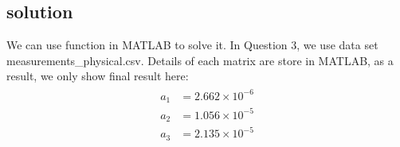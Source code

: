 \documentclass[titlepage,a4paper]{article}
\begin{document}
    \subsection{solution}    
        We can use function in MATLAB to solve it. In Question 3, we use data set measurements_physical.csv. Details of each matrix are store in MATLAB, as a result, we only show final result here:
        \begin{align}
        \begin{split}
           a_1 &= 2.662\times10^{-6}\\
           a_2 &= 1.056\times10^{-5}\\
           a_3 &= 2.135\times10^{-5}      
        \end{split}
        \end{align}     


\ifx \allfiles \undefined    
\end{document}
